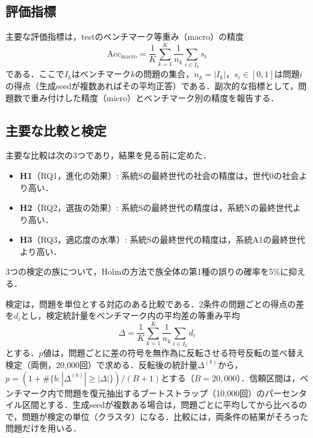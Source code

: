 \subsection{評価指標}
\label{sec:4.5.1}

主要な評価指標は，testのベンチマーク等重み（macro）の精度
\begin{equation}
\mathrm{Acc}_{\mathrm{macro}} = \frac{1}{K} \sum_{k=1}^{K} \frac{1}{n_k} \sum_{i \in I_k} s_i
\label{eq:macroacc}
\end{equation}
である．ここで$I_k$はベンチマーク$k$の問題の集合，$n_k = |I_k|$，$s_i \in [0, 1]$は問題$i$の得点（生成seedが複数あればその平均正答）である．副次的な指標として，問題数で重み付けした精度（micro）とベンチマーク別の精度を報告する．

\subsection{主要な比較と検定}
\label{sec:4.5.2}

主要な比較は次の3つであり，結果を見る前に定めた．
\begin{itemize}
\item \textbf{H1}（RQ1，進化の効果）: 系統Sの最終世代の社会の精度は，世代0の社会より高い．
\item \textbf{H2}（RQ2，選抜の効果）: 系統Sの最終世代の精度は，系統Nの最終世代より高い．
\item \textbf{H3}（RQ3，適応度の水準）: 系統Sの最終世代の精度は，系統A1の最終世代より高い．
\end{itemize}
3つの検定の族について，Holmの方法\cite{holm1979simple}で族全体の第1種の誤りの確率を5\%に抑える．

検定は，問題を単位とする対応のある比較である\cite{miller2024adding}．2条件の問題ごとの得点の差を$d_i$とし，検定統計量をベンチマーク内の平均差の等重み平均
\begin{equation}
\Delta = \frac{1}{K} \sum_{k=1}^{K} \frac{1}{n_k} \sum_{i \in I_k} d_i
\label{eq:delta}
\end{equation}
とする．$p$値は，問題ごとに差の符号を無作為に反転させる符号反転の並べ替え検定（両側，20,000回）で求める．反転後の統計量$\Delta^{(b)}$から，$p = (1 + \#\{b : |\Delta^{(b)}| \geq |\Delta|\}) / (B + 1)$とする（$B = 20{,}000$）．信頼区間は，ベンチマーク内で問題を復元抽出するブートストラップ（10,000回）のパーセンタイル区間とする．生成seedが複数ある場合は，問題ごとに平均してから比べるので，問題が検定の単位（クラスタ）になる．比較には，両条件の結果がそろった問題だけを用いる．

